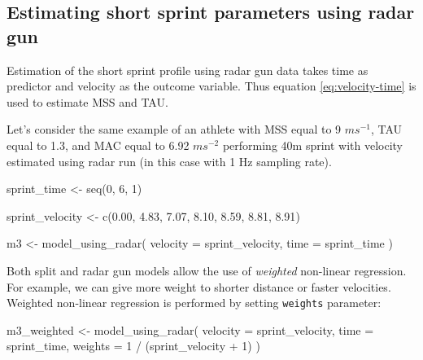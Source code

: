 \documentclass[fleqn,10pt,lineno]{wlpeerj} %
\newenvironment{Shaded}{\begin{snugshade}}{\end{snugshade}}
\newcommand{\AttributeTok}[1]{\textcolor[rgb]{0.77,0.63,0.00}{#1}}
\newcommand{\DecValTok}[1]{\textcolor[rgb]{0.00,0.00,0.81}{#1}}
\newcommand{\FloatTok}[1]{\textcolor[rgb]{0.00,0.00,0.81}{#1}}
\newcommand{\FunctionTok}[1]{\textcolor[rgb]{0.00,0.00,0.00}{#1}}
\newcommand{\NormalTok}[1]{#1}
\newcommand{\OtherTok}[1]{\textcolor[rgb]{0.56,0.35,0.01}{#1}}
\newcommand{\SpecialCharTok}[1]{\textcolor[rgb]{0.00,0.00,0.00}{#1}}
\begin{document}
\hypertarget{estimating-short-sprint-parameters-using-radar-gun}{%
\subsection{Estimating short sprint parameters using radar gun}\label{estimating-short-sprint-parameters-using-radar-gun}}

Estimation of the short sprint profile using radar gun data takes time as predictor and velocity as the outcome variable. Thus equation \eqref{eq:velocity-time} is used to estimate MSS and TAU.

Let's consider the same example of an athlete with MSS equal to 9 \(ms^{-1}\), TAU equal to 1.3, and MAC equal to 6.92 \(ms^{-2}\) performing 40m sprint with velocity estimated using radar run (in this case with 1 Hz sampling rate).

\begin{Shaded}
\begin{Highlighting}[]
\NormalTok{sprint\_time }\OtherTok{\textless{}{-}} \FunctionTok{seq}\NormalTok{(}\DecValTok{0}\NormalTok{, }\DecValTok{6}\NormalTok{, }\DecValTok{1}\NormalTok{)}

\NormalTok{sprint\_velocity }\OtherTok{\textless{}{-}} \FunctionTok{c}\NormalTok{(}\FloatTok{0.00}\NormalTok{, }\FloatTok{4.83}\NormalTok{, }\FloatTok{7.07}\NormalTok{, }\FloatTok{8.10}\NormalTok{, }\FloatTok{8.59}\NormalTok{, }\FloatTok{8.81}\NormalTok{, }\FloatTok{8.91}\NormalTok{)}

\NormalTok{m3 }\OtherTok{\textless{}{-}} \FunctionTok{model\_using\_radar}\NormalTok{(}
  \AttributeTok{velocity =}\NormalTok{ sprint\_velocity,}
  \AttributeTok{time =}\NormalTok{ sprint\_time}
\NormalTok{)}
\end{Highlighting}
\end{Shaded}

Both split and radar gun models allow the use of \emph{weighted} non-linear regression. For example, we can give more weight to shorter distance or faster velocities. Weighted non-linear regression is performed by setting \texttt{weights} parameter:

\begin{Shaded}
\begin{Highlighting}[]
\NormalTok{m3\_weighted }\OtherTok{\textless{}{-}} \FunctionTok{model\_using\_radar}\NormalTok{(}
  \AttributeTok{velocity =}\NormalTok{ sprint\_velocity,}
  \AttributeTok{time =}\NormalTok{ sprint\_time,}
  \AttributeTok{weights =} \DecValTok{1} \SpecialCharTok{/}\NormalTok{ (sprint\_velocity }\SpecialCharTok{+} \DecValTok{1}\NormalTok{)}
\NormalTok{)}
\end{Highlighting}
\end{Shaded}
\end{document}
